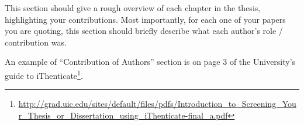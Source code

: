\authorcontributions

This section should give a rough overview of each chapter in the thesis,
highlighting your contributions.  Most importantly, for each one of your
papers you are quoting, this section should briefly describe what each author's
role / contribution was.

An example of ``Contribution of Authors'' section is on page 3 of the
University's guide to iThenticate\footnote{\url{http://grad.uic.edu/sites/default/files/pdfs/Introduction_to_Screening_Your_Thesis_or_Dissertation_using_iThenticate-final_a.pdf}}.
